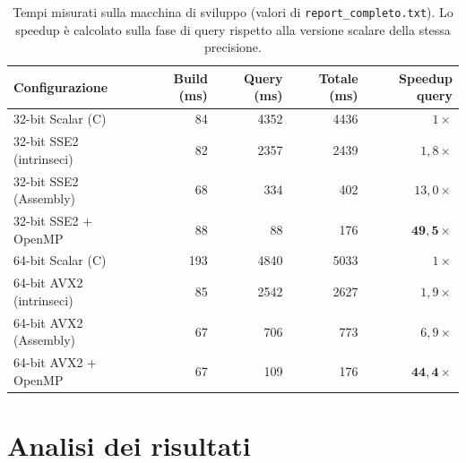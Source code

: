 \begin{table}[H]
\centering
\small
\renewcommand{\arraystretch}{1.35}
\begin{tabular}{|l|r|r|r|r|}
\hline
\textbf{Configurazione} & \textbf{Build (ms)} & \textbf{Query (ms)} & \textbf{Totale (ms)} & \textbf{Speedup query} \\ \hline
32-bit Scalar (C)        &  84 & 4352 & 4436 & $1\times$ \\ \hline
32-bit SSE2 (intrinseci) &  82 & 2357 & 2439 & $1{,}8\times$ \\ \hline
32-bit SSE2 (Assembly)   &  68 &  334 &  402 & $13{,}0\times$ \\ \hline
32-bit SSE2 + OpenMP     &  88 &   88 &  176 & $\mathbf{49{,}5\times}$ \\ \hline
64-bit Scalar (C)        & 193 & 4840 & 5033 & $1\times$ \\ \hline
64-bit AVX2 (intrinseci) &  85 & 2542 & 2627 & $1{,}9\times$ \\ \hline
64-bit AVX2 (Assembly)   &  67 &  706 &  773 & $6{,}9\times$ \\ \hline
64-bit AVX2 + OpenMP     &  67 &  109 &  176 & $\mathbf{44{,}4\times}$ \\ \hline
\end{tabular}
\caption{Tempi misurati sulla macchina di sviluppo (valori di \texttt{report\_completo.txt}). Lo speedup è calcolato sulla fase di query rispetto alla versione scalare della stessa precisione.}
\end{table}

\section{Analisi dei risultati}

